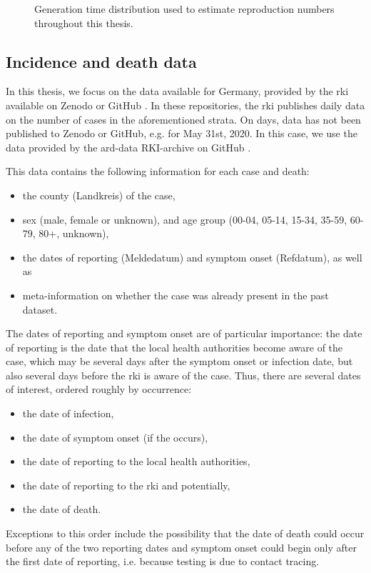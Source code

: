 \begin{figure}
    \resizebox{\textwidth}{!}{%
    }
    \caption{Generation time distribution used to estimate reproduction numbers throughout this thesis.}
    \label{fig:generation_time}
\end{figure}

\subsection{Incidence and death data}
In this thesis, we focus on the data available for Germany, provided by the \acrshort{rki} available on Zenodo \citep{RobertKoch-Institut2024SARSCoV2} or GitHub \citep{RobertKoch-Institut2024SARSCoV2a}. In these repositories, the \acrshort{rki} publishes daily data on the number of cases in the aforementioned strata. On days, data has not been published to Zenodo or GitHub, e.g. for May 31st, 2020. In this case, we use the data provided by the ard-data RKI-archive on GitHub \citep{MichaelKreil2022RKICoronaDatenArchiv}. 

This data contains the following information for each case and death:
\begin{itemize}
    \item the county (Landkreis) of the case,
    \item sex (male, female or unknown), and age group (00-04, 05-14, 15-34, 35-59, 60-79, 80+, unknown),
    \item the dates of reporting (Meldedatum) and symptom onset (Refdatum), as well as
    \item meta-information on whether the case was already present in the past dataset.
\end{itemize}

The dates of reporting and symptom onset are of particular importance: the date of reporting is the date that the local health authorities become aware of the case, which may be several days after the symptom onset or infection date, but also several days before the \acrshort{rki} is aware of the case. Thus, there are several dates of interest, ordered roughly by occurrence: 
\begin{itemize}
    \item the date of infection, 
    \item the date of symptom onset (if the occurs), 
    \item the date of reporting to the local health authorities,
    \item the date of reporting to the \acrshort{rki} and potentially,
    \item the date of death.
\end{itemize}
Exceptions to this order include the possibility that the date of death could occur before any of the two reporting dates and symptom onset could begin only after the first date of reporting, i.e. because testing is due to contact tracing.

